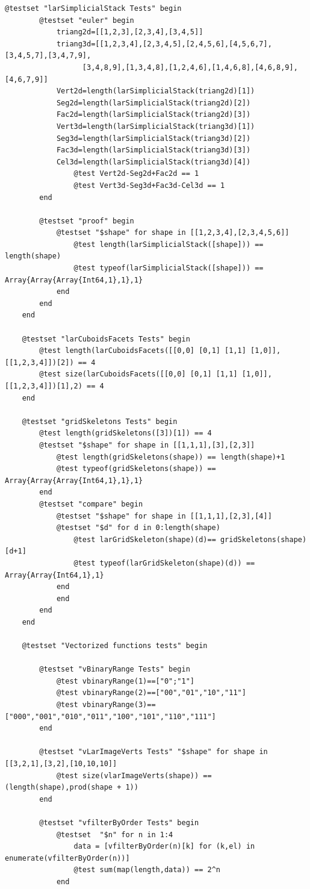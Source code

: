 \documentclass{article}
\begin{document}
\begin{flushleft}
\begin{list}{}{}
\begin{Verbatim}[tabsize=4]
	@testset "larSimplicialStack Tests" begin
        @testset "euler" begin
			triang2d=[[1,2,3],[2,3,4],[3,4,5]]
            triang3d=[[1,2,3,4],[2,3,4,5],[2,4,5,6],[4,5,6,7],[3,4,5,7],[3,4,7,9],
                  [3,4,8,9],[1,3,4,8],[1,2,4,6],[1,4,6,8],[4,6,8,9],[4,6,7,9]]
            Vert2d=length(larSimplicialStack(triang2d)[1])
            Seg2d=length(larSimplicialStack(triang2d)[2])
            Fac2d=length(larSimplicialStack(triang2d)[3])
            Vert3d=length(larSimplicialStack(triang3d)[1])
            Seg3d=length(larSimplicialStack(triang3d)[2])
            Fac3d=length(larSimplicialStack(triang3d)[3])
            Cel3d=length(larSimplicialStack(triang3d)[4])
                @test Vert2d-Seg2d+Fac2d == 1
                @test Vert3d-Seg3d+Fac3d-Cel3d == 1
		end
		
		@testset "proof" begin
			@testset "$shape" for shape in [[1,2,3,4],[2,3,4,5,6]]
				@test length(larSimplicialStack([shape])) == length(shape)
				@test typeof(larSimplicialStack([shape])) == Array{Array{Array{Int64,1},1},1}
			end
		end
	end	
	
	@testset "larCuboidsFacets Tests" begin
		@test length(larCuboidsFacets([[0,0] [0,1] [1,1] [1,0]], [[1,2,3,4]])[2]) == 4
		@test size(larCuboidsFacets([[0,0] [0,1] [1,1] [1,0]], [[1,2,3,4]])[1],2) == 4 
	end
	
	@testset "gridSkeletons Tests" begin
        @test length(gridSkeletons([3])[1]) == 4
      	@testset "$shape" for shape in [[1,1,1],[3],[2,3]]
			@test length(gridSkeletons(shape)) == length(shape)+1
			@test typeof(gridSkeletons(shape)) == Array{Array{Array{Int64,1},1},1}
		end
		@testset "compare" begin
			@testset "$shape" for shape in [[1,1,1],[2,3],[4]]
			@testset "$d" for d in 0:length(shape)
				@test larGridSkeleton(shape)(d)== gridSkeletons(shape)[d+1] 
				@test typeof(larGridSkeleton(shape)(d)) == Array{Array{Int64,1},1}
			end
			end
		end
	end
    
    @testset "Vectorized functions tests" begin	
	
	    @testset "vBinaryRange Tests" begin
		    @test vbinaryRange(1)==["0";"1"]
		    @test vbinaryRange(2)==["00","01","10","11"]
		    @test vbinaryRange(3)==["000","001","010","011","100","101","110","111"]
	    end

	    @testset "vLarImageVerts Tests" "$shape" for shape in [[3,2,1],[3,2],[10,10,10]]
		    @test size(vlarImageVerts(shape)) == (length(shape),prod(shape + 1))
	    end

	    @testset "vfilterByOrder Tests" begin
		    @testset  "$n" for n in 1:4
			    data = [vfilterByOrder(n)[k] for (k,el) in enumerate(vfilterByOrder(n))]
			    @test sum(map(length,data)) == 2^n
		    end


\end{Verbatim}
\end{list}
\end{flushleft}
\end{document}
